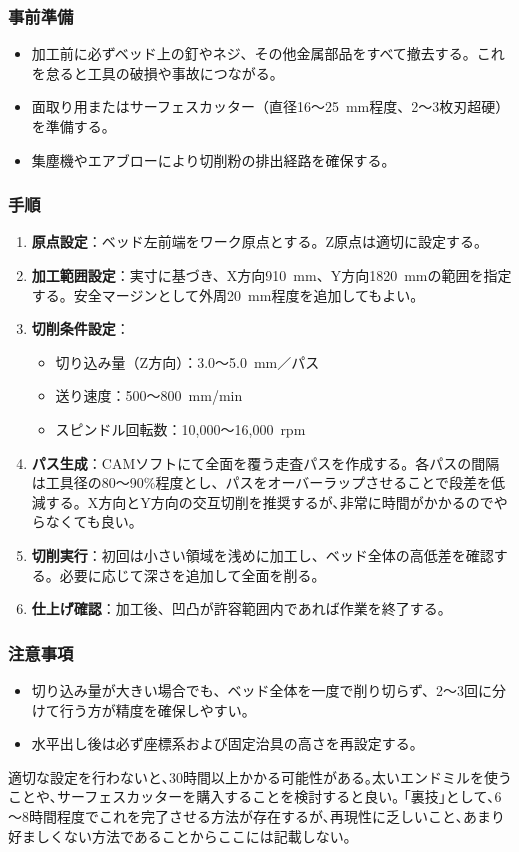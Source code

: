 \documentclass[uplatex,dvipdfmx]{ujarticle}
\begin{document}
\subsubsection*{事前準備}
\begin{itemize}
    \item 加工前に必ずベッド上の釘やネジ、その他金属部品をすべて撤去する。これを怠ると工具の破損や事故につながる。
    \item 面取り用またはサーフェスカッター（直径16～25~mm程度、2～3枚刃超硬）を準備する。
    \item 集塵機やエアブローにより切削粉の排出経路を確保する。
\end{itemize}

\subsubsection*{手順}
\begin{enumerate}
    \item \textbf{原点設定}：ベッド左前端をワーク原点とする。Z原点は適切に設定する。
    \item \textbf{加工範囲設定}：実寸に基づき、X方向910~mm、Y方向1820~mmの範囲を指定する。安全マージンとして外周20~mm程度を追加してもよい。
    \item \textbf{切削条件設定}：
    \begin{itemize}
        \item 切り込み量（Z方向）：3.0～5.0~mm／パス
        \item 送り速度：500～800~mm/min
        \item スピンドル回転数：10,000～16,000~rpm
    \end{itemize}
    \item \textbf{パス生成}：CAMソフトにて全面を覆う走査パスを作成する。各パスの間隔は工具径の80～90\%程度とし、パスをオーバーラップさせることで段差を低減する。X方向とY方向の交互切削を推奨するが､非常に時間がかかるのでやらなくても良い。
    \item \textbf{切削実行}：初回は小さい領域を浅めに加工し、ベッド全体の高低差を確認する。必要に応じて深さを追加して全面を削る。
    \item \textbf{仕上げ確認}：加工後、凹凸が許容範囲内であれば作業を終了する。
\end{enumerate}

\subsubsection*{注意事項}
\begin{itemize}
    \item 切り込み量が大きい場合でも、ベッド全体を一度で削り切らず、2～3回に分けて行う方が精度を確保しやすい。
    \item 水平出し後は必ず座標系および固定治具の高さを再設定する。
\end{itemize}
適切な設定を行わないと､30時間以上かかる可能性がある｡太いエンドミルを使うことや､サーフェスカッターを購入することを検討すると良い｡
｢裏技｣として､6～8時間程度でこれを完了させる方法が存在するが､再現性に乏しいこと､あまり好ましくない方法であることからここには記載しない｡
\end{document}
